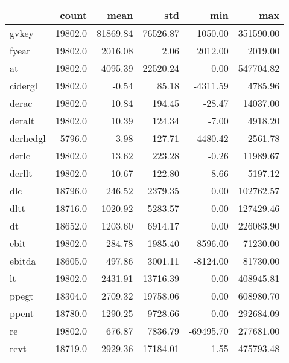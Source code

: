 \begin{tabular}{lrrrrr}
\toprule
{} &    count &      mean &       std &       min &         max \\
\midrule
gvkey                   &  19802.0 &  81869.84 &  76526.87 &   1050.00 &   351590.00 \\
fyear                   &  19802.0 &   2016.08 &      2.06 &   2012.00 &     2019.00 \\
at                      &  19802.0 &   4095.39 &  22520.24 &      0.00 &   547704.82 \\
cidergl                 &  19802.0 &     -0.54 &     85.18 &  -4311.59 &     4785.96 \\
derac                   &  19802.0 &     10.84 &    194.45 &    -28.47 &    14037.00 \\
deralt                  &  19802.0 &     10.39 &    124.34 &     -7.00 &     4918.20 \\
derhedgl                &   5796.0 &     -3.98 &    127.71 &  -4480.42 &     2561.78 \\
derlc                   &  19802.0 &     13.62 &    223.28 &     -0.26 &    11989.67 \\
derllt                  &  19802.0 &     10.67 &    122.80 &     -8.66 &     5197.12 \\
dlc                     &  18796.0 &    246.52 &   2379.35 &      0.00 &   102762.57 \\
dltt                    &  18716.0 &   1020.92 &   5283.57 &      0.00 &   127429.46 \\
dt                      &  18652.0 &   1203.60 &   6914.17 &      0.00 &   226083.90 \\
ebit                    &  19802.0 &    284.78 &   1985.40 &  -8596.00 &    71230.00 \\
ebitda                  &  18605.0 &    497.86 &   3001.11 &  -8124.00 &    81730.00 \\
lt                      &  19802.0 &   2431.91 &  13716.39 &      0.00 &   408945.81 \\
ppegt                   &  18304.0 &   2709.32 &  19758.06 &      0.00 &   608980.70 \\
ppent                   &  18780.0 &   1290.25 &   9728.66 &      0.00 &   292684.09 \\
re                      &  19802.0 &    676.87 &   7836.79 & -69495.70 &   277681.00 \\
revt                    &  18719.0 &   2929.36 &  17184.01 &     -1.55 &   475793.48 \\

\end{tabular}
